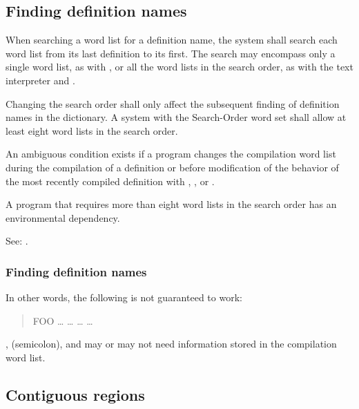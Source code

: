 \subsection{Finding definition names} %
\label{search:find}

When searching a word list for a definition name, the system shall
search each word list from its last definition to its first. The
search may encompass only a single word list, as with
, or all the word lists in the search order,
as with the text interpreter and .

Changing the search order shall only affect the subsequent finding
of definition names in the dictionary. A system with the Search-Order
word set shall allow at least eight word lists in the search order.

An ambiguous condition exists if a program changes the compilation
word list during the compilation of a definition or before
modification of the behavior of the most recently compiled definition
with , , or
.

A program that requires more than eight word lists in the search
order has an environmental dependency.

See: .

\begin{info}
\subsubsection{Finding definition names} %

In other words, the following is not guaranteed to work:

\begin{quote}\ttfamily
	\word{:} FOO {\ldots}
		\word{[} {\ldots}  \word{]}
		{\ldots}  {\ldots} \\
	\word{;} 
\end{quote}
, \word{;} (semicolon), and  may or may
not need information stored in the compilation word list.
\end{info}

\subsection{Contiguous regions} %

